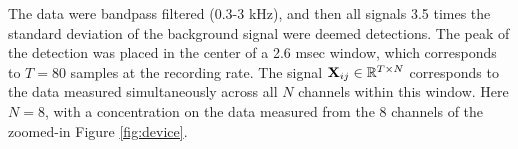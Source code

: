\documentclass[journal]{IEEEtran}
\begin{document}
The data were bandpass filtered (0.3-3 kHz), and
then all signals 3.5 times the standard deviation of the background
signal were deemed detections. The peak of the detection was placed
in the center of a 2.6 msec window, which corresponds to $T=80$
samples at the recording rate. The signal
${\mathbf X}_{ij}\in\mathbb{R}^{T\times N}$ corresponds to the data
measured simultaneously across all $N$ channels within this window.
Here $N=8$, with a concentration on the data measured from the 8
channels of the zoomed-in Figure \ref{fig:device}.

\end{document}
